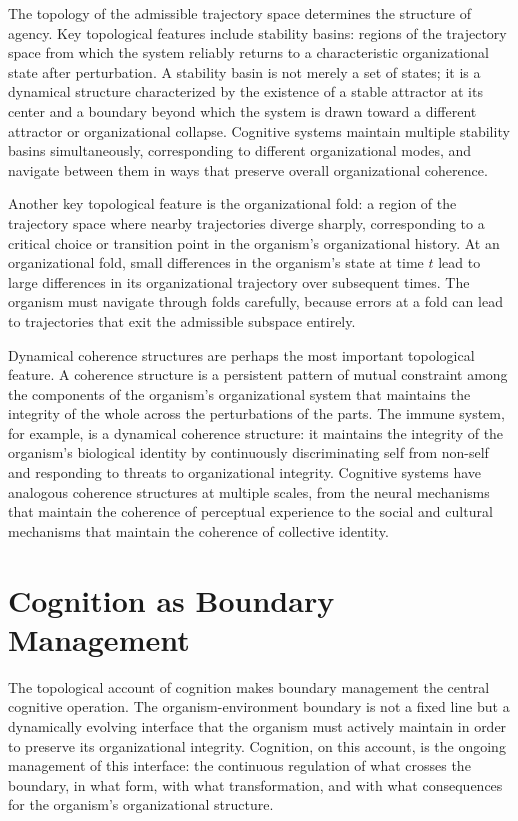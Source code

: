\documentclass[12pt,a4paper]{report}
\theoremstyle{flyxion}
\begin{document}
The topology of the admissible trajectory space determines the structure of agency. Key topological features include stability basins: regions of the trajectory space from which the system reliably returns to a characteristic organizational state after perturbation. A stability basin is not merely a set of states; it is a dynamical structure characterized by the existence of a stable attractor at its center and a boundary beyond which the system is drawn toward a different attractor or organizational collapse. Cognitive systems maintain multiple stability basins simultaneously, corresponding to different organizational modes, and navigate between them in ways that preserve overall organizational coherence.

Another key topological feature is the organizational fold: a region of the trajectory space where nearby trajectories diverge sharply, corresponding to a critical choice or transition point in the organism's organizational history. At an organizational fold, small differences in the organism's state at time $t$ lead to large differences in its organizational trajectory over subsequent times. The organism must navigate through folds carefully, because errors at a fold can lead to trajectories that exit the admissible subspace entirely.

Dynamical coherence structures are perhaps the most important topological feature. A coherence structure is a persistent pattern of mutual constraint among the components of the organism's organizational system that maintains the integrity of the whole across the perturbations of the parts. The immune system, for example, is a dynamical coherence structure: it maintains the integrity of the organism's biological identity by continuously discriminating self from non-self and responding to threats to organizational integrity. Cognitive systems have analogous coherence structures at multiple scales, from the neural mechanisms that maintain the coherence of perceptual experience to the social and cultural mechanisms that maintain the coherence of collective identity.

\section{Cognition as Boundary Management}

The topological account of cognition makes boundary management the central cognitive operation. The organism-environment boundary is not a fixed line but a dynamically evolving interface that the organism must actively maintain in order to preserve its organizational integrity. Cognition, on this account, is the ongoing management of this interface: the continuous regulation of what crosses the boundary, in what form, with what transformation, and with what consequences for the organism's organizational structure.
\end{document}
